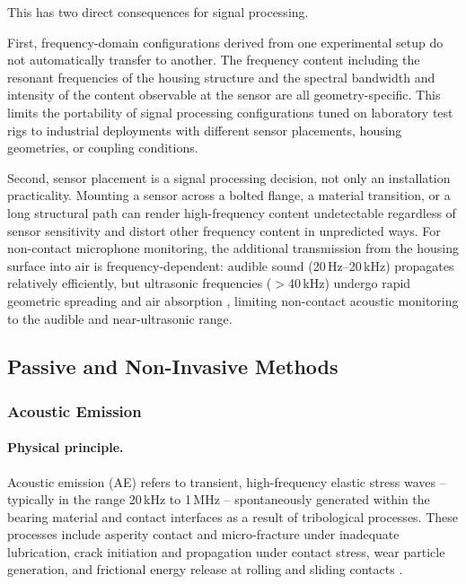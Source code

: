 This has two direct consequences for signal processing.

First, frequency-domain configurations derived from one experimental setup do not automatically transfer to another. The frequency content including the resonant frequencies of the housing structure and the spectral bandwidth and intensity of the content observable at the sensor are all geometry-specific. This limits the portability of signal processing configurations tuned on laboratory test rigs to industrial deployments with different sensor placements, housing geometries, or coupling conditions.

Second, sensor placement is a signal processing decision, not only an installation practicality. Mounting a sensor across a bolted flange, a material transition, or a long structural path can render high-frequency content undetectable regardless of sensor sensitivity and distort other frequency content in unpredicted ways. For non-contact microphone monitoring, the additional transmission from the housing surface into air is frequency-dependent: audible sound (20\,Hz--20\,kHz) propagates relatively efficiently, but ultrasonic frequencies ($>$40\,kHz) undergo rapid geometric spreading and air absorption \cite{carotenuto_ranging_2021}, limiting non-contact acoustic monitoring to the audible and near-ultrasonic range.

\subsection{Passive and Non-Invasive Methods}
\label{subsec:passive_noninv}

\subsubsection{Acoustic Emission}
\label{subsubsec:ae}

\paragraph{Physical principle.} Acoustic emission (AE) refers to transient, high-frequency elastic stress waves -- typically in the range 20\,kHz to 1\,MHz -- spontaneously generated within the bearing material and contact interfaces as a result of tribological processes. These processes include asperity contact and micro-fracture under inadequate lubrication, crack initiation and propagation under contact stress, wear particle generation, and frictional energy release at rolling and sliding contacts \cite{hou_-situ_2025,delft_university_of_technology_tu_delft_influence_2024,scheeren_acoustic_2024}.

